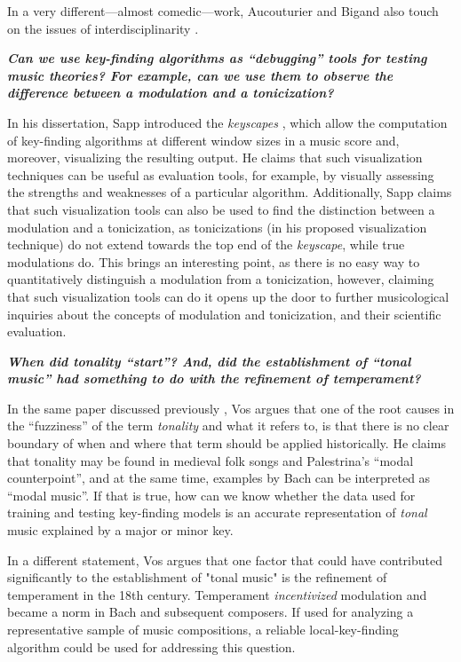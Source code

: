 In a very different---almost comedic---work, Aucouturier and Bigand also touch on the issues of interdisciplinarity \cite{aucouturier_mel_2012}.

\textbf{\emph{Can we use key-finding algorithms as ``debugging'' tools for testing music theories? For example, can we use them to observe the difference between a modulation and a tonicization?}}

In his dissertation, Sapp introduced the \emph{keyscapes} \cite{sapp_computational_2011}, which allow the computation of key-finding algorithms at different window sizes in a music score and, moreover, visualizing the resulting output. He claims that such visualization techniques can be useful as evaluation tools, for example, by visually assessing the strengths and weaknesses of a particular algorithm. Additionally, Sapp claims that such visualization tools can also be used to find the distinction between a modulation and a tonicization, as tonicizations (in his proposed visualization technique) do not extend towards the top end of the \emph{keyscape}, while true modulations do. This brings an interesting point, as there is no easy way to quantitatively distinguish a modulation from a tonicization, however, claiming that such visualization tools can do it opens up the door to further musicological inquiries about the concepts of modulation and tonicization, and their scientific evaluation. 


\textbf{\emph{When did tonality ``start''? And, did the establishment of ``tonal music'' had something to do with the refinement of temperament?}}

In the same paper discussed previously \cite{vos_tonality_2000}, Vos argues that one of the root causes in the ``fuzziness'' of the term \emph{tonality} and what it refers to, is that there is no clear boundary of when and where that term should be applied historically. He claims that tonality may be found in medieval folk songs and Palestrina's ``modal counterpoint'', and at the same time, examples by Bach can be interpreted as ``modal music''. If that is true, how can we know whether the data used for training and testing key-finding models is an accurate representation of \emph{tonal} music explained by a major or minor key.

In a different statement, Vos argues that one factor that could have contributed significantly to the establishment of "tonal music" is the refinement of temperament in the 18th century. Temperament \emph{incentivized} modulation and became a norm in Bach and subsequent composers. If used for analyzing a representative sample of music compositions, a reliable local-key-finding algorithm could be used for addressing this question.

